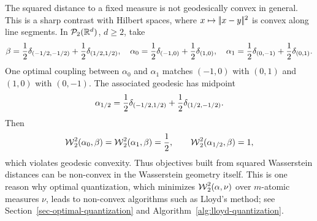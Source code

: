 \begin{example}

The squared distance to a fixed measure is not geodesically convex in general. This is a sharp contrast with Hilbert spaces, where \(x\mapsto|\!| x-y |\!|^2\) is convex along line segments. In \(\mathcal{P}_2(\mathbb{R}^d)\), \(d\geq2\), take
\[
	\beta=\frac12\delta_{(-1/2,-1/2)}+\frac12\delta_{(1/2,1/2)},
	\quad
	\alpha_0=\frac12\delta_{(-1,0)}+\frac12\delta_{(1,0)},
	\quad
	\alpha_1=\frac12\delta_{(0,-1)}+\frac12\delta_{(0,1)}.
\]
One optimal coupling between \(\alpha_0\) and \(\alpha_1\) matches \((-1,0)\) with \((0,1)\) and \((1,0)\) with \((0,-1)\). The associated geodesic has midpoint
\[
	\alpha_{1/2}=\frac12\delta_{(-1/2,1/2)}+\frac12\delta_{(1/2,-1/2)}.
\]
Then
\[
	\operatorname{\mathcal{W}}_2^2(\alpha_0,\beta)
	=
	\operatorname{\mathcal{W}}_2^2(\alpha_1,\beta)
	=
	\frac12,
	\qquad
	\operatorname{\mathcal{W}}_2^2(\alpha_{1/2},\beta)
	=
	1,
\]
which violates geodesic convexity. Thus objectives built from squared Wasserstein distances can be non-convex in the Wasserstein geometry itself. This is one reason why optimal quantization, which minimizes \(\operatorname{\mathcal{W}}_2^2(\alpha,\nu)\) over \(m\)-atomic measures \(\nu\), leads to non-convex algorithms such as Lloyd's method; see Section~\ref{sec-optimal-quantization} and Algorithm~\ref{alg:lloyd-quantization}.
\end{example}

